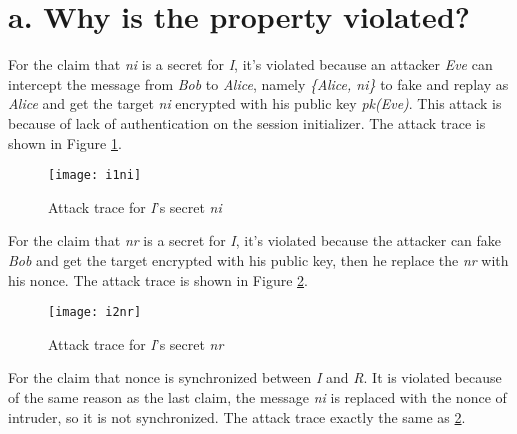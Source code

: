 \documentclass[a4paper, 12pt]{report}
\begin{document}
    \section*{a. Why is the property violated?}
    For the claim that \emph{ni} is a secret for \emph{I}, it's violated because an attacker \emph{Eve} can intercept the message from \emph{Bob} to \emph{Alice}, namely \emph{\{Alice, ni\}} to fake and replay as \emph{Alice} and get the target \emph{ni} encrypted with his public key \emph{pk(Eve)}. This attack is because of lack of authentication on the session initializer. The attack trace is shown in Figure \ref{i1ni}.
    \begin{figure}[H]
        \centering
        \texttt{[image: i1ni]}
        \caption{Attack trace for \emph{I}'s secret \emph{ni}}
        \label{i1ni}
    \end{figure}
    For the claim that \emph{nr} is a secret for \emph{I}, it's violated because the attacker can fake \emph{Bob} and get the target encrypted with his public key, then he replace the \emph{nr} with his nonce. The attack trace is shown in Figure \ref{i2nr}.
    \begin{figure}[H]
        \centering
        \texttt{[image: i2nr]}
        \caption{Attack trace for \emph{I}'s secret \emph{nr}}
        \label{i2nr}
    \end{figure}
    For the claim that nonce is synchronized between \emph{I} and \emph{R}. It is violated because of the same reason as the last claim, the message \emph{ni} is replaced with the nonce of intruder, so it is not synchronized. The attack trace exactly the same as \ref{i2nr}.
\end{document}
